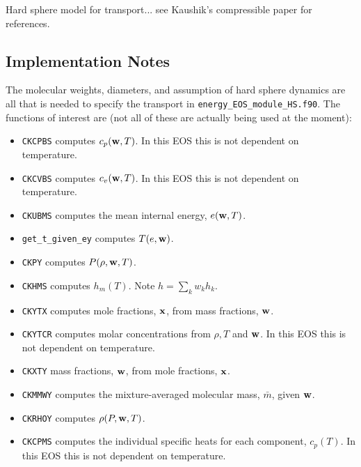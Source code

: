 \documentclass[final]{siamltex}
\def\wb {{\bf w}}
\def\xb {{\bf x}}
\begin{document}
Hard sphere model for transport... see Kaushik's compressible paper for references.

\subsection{Implementation Notes}
The molecular weights, diameters, and assumption of hard sphere dynamics
 are all that is needed to specify the transport in
{\tt energy\_EOS\_module\_HS.f90}.  The functions of interest are
(not all of these are actually being used at the moment):\\
\begin{itemize}

\item {\tt CKCPBS} computes $c_p(\wb,T)$.  In this EOS this is not dependent on temperature.\\

\item {\tt CKCVBS} computes $c_v(\wb,T)$.  In this EOS this is not dependent on temperature.\\

\item {\tt CKUBMS} computes the mean internal energy, $e(\wb,T)$.\\

\item {\tt get\_t\_given\_ey} computes $T(e,\wb)$.\\

\item {\tt CKPY} computes $P(\rho,\wb,T)$.\\

\item {\tt CKHMS} computes $h_m(T)$.  Note $h = \sum_k w_k h_k$.\\

\item {\tt CKYTX} computes mole fractions, $\xb$, from mass fractions, $\wb$.\\

\item {\tt CKYTCR} computes molar concentrations from $\rho,T$ and $\wb$.
In this EOS this is not dependent on temperature.\\

\item {\tt CKXTY} mass fractions, $\wb$, from mole fractions, $\xb$.\\

\item {\tt CKMMWY} computes the mixture-averaged molecular mass, $\bar{m}$, given $\wb$.\\

\item {\tt CKRHOY} computes $\rho(P,\wb,T)$.\\

\item {\tt CKCPMS} computes the individual specific heats for each component,
$c_p(T)$.  In this EOS this is not dependent on temperature.\\

\end{itemize}
\end{document}

